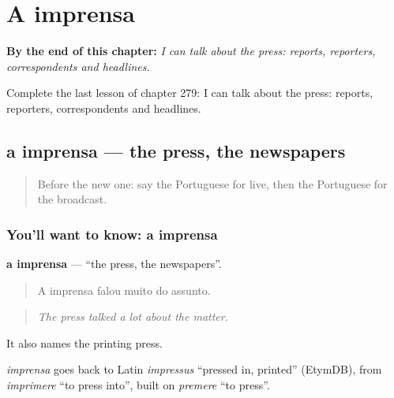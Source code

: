 
\chapter{A imprensa}
\label{ch:pt-a-imprensa}

\begin{chapteropening}
\textbf{By the end of this chapter:} \emph{I can talk about the press: reports, reporters, correspondents and headlines.}

Complete the last lesson of chapter 279: I can talk about the press: reports, reporters, correspondents and headlines.
\end{chapteropening}

\section[a imprensa]{a imprensa — the press, the newspapers}

\label{lesson:PT-C279-imprensa}



\begin{quote}
Before the new one: say the Portuguese for live, then the Portuguese for the broadcast.
\end{quote}

\subsection*{You'll want to know: a imprensa}
\textbf{a imprensa} — \textquotedblleft{}the press, the newspapers\textquotedblright{}.

\begin{quote}
A imprensa falou muito do assunto.
\end{quote}

\begin{quote}
\emph{The press talked a lot about the matter.}
\end{quote}

It also names the printing press.

\begin{cousinweb}
\emph{imprensa} goes back to Latin \emph{impressus} \textquotedblleft{}pressed in, printed\textquotedblright{} (EtymDB), from \emph{imprimere} \textquotedblleft{}to press into\textquotedblright{}, built on \emph{premere} \textquotedblleft{}to press\textquotedblright{}.
\end{cousinweb}

